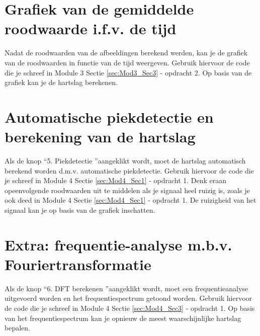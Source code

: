\section{Grafiek van de gemiddelde roodwaarde i.f.v. de tijd}
\label{sec:Mod5_Sec4}
%
Nadat de roodwaarden van de afbeeldingen berekend werden, kan je de grafiek van de roodwaarden in functie van de tijd weergeven. Gebruik hiervoor de code die je schreef in Module 3 Sectie \ref{sec:Mod3_Sec3} - opdracht 2. Op basis van de grafiek kan je de hartslag berekenen.

\section{Automatische piekdetectie en berekening van de hartslag}
\label{sec:Mod5_Sec5}
%
Als de knop \textquotedblleft 5. Piekdetectie \textquotedblright aangeklikt wordt, moet de hartslag automatisch berekend worden d.m.v. automatische piekdetectie. Gebruik hiervoor de code die je schreef in Module 4 Sectie \ref{sec:Mod4_Sec1} - opdracht 1. Denk eraan opeenvolgende roodwaarden uit te middelen als je signaal heel ruizig is, zoals je ook deed in Module 4 Sectie \ref{sec:Mod4_Sec1} - opdracht 1. De ruizigheid van het signaal kan je op basis van de grafiek inschatten.

\section{Extra: frequentie-analyse m.b.v. Fouriertransformatie}
\label{sec:Mod5_Sec6}
%
Als de knop \textquotedblleft 6. DFT berekenen \textquotedblright aangeklikt wordt, moet een frequentieanalyse uitgevoerd worden en het frequentiespectrum getoond worden. Gebruik hiervoor de code die je schreef in Module 4 Sectie \ref{sec:Mod4_Sec3} - opdracht 1. Op basis van het frequentiespectrum kan je opnieuw de meest waarschijnlijke hartslag bepalen.

